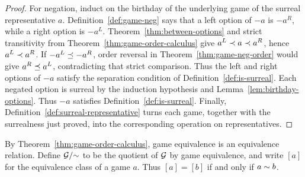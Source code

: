 \begin{proof}
  For negation, induct on the birthday of the underlying game of the surreal
  representative \(a\).  Definition~\ref{def:game-neg} says that
  a left option of \(-a\) is \(-a^R\), while a right option is \(-a^L\).
  Theorem~\ref{thm:between-options} and strict transitivity from
  Theorem~\ref{thm:game-order-calculus} give
  \(a^L\prec a\prec a^R\), hence \(a^L\prec a^R\).  If
  \(-a^L\preceq-a^R\), order reversal in
  Theorem~\ref{thm:game-neg-order} would give \(a^R\preceq a^L\), contradicting
  that strict comparison.  Thus the left and right options of \(-a\) satisfy
  the separation condition of Definition~\ref{def:is-surreal}.
  Each negated option is surreal by the induction hypothesis and
  Lemma~\ref{lem:birthday-options}.  Thus \(-a\) satisfies
  Definition~\ref{def:is-surreal}.  Finally, Definition~\ref{def:surreal-representative}
  turns each game, together with the surrealness just proved, into the
  corresponding operation on representatives.
\end{proof}

\begin{definition}
  \label{def:game-quotient}
  \leanok
  By Theorem~\ref{thm:game-order-calculus}, game equivalence is an equivalence relation.
  Define \(\mathcal{G}/{\sim}\) to be the quotient of \(\mathcal{G}\) by game equivalence, and
  write \([a]\) for the equivalence class of a game \(a\).  Thus \([a]=[b]\) if and only
  if \(a\sim b\).
\end{definition}

